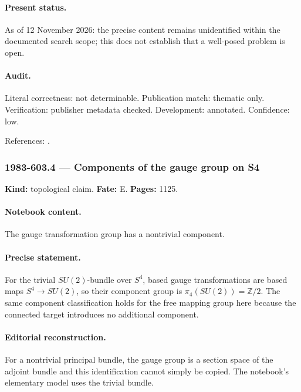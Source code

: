 \paragraph{Present status.} As of 12 November 2026: the precise content remains unidentified within the documented search scope; this does not establish that a well-posed problem is open.

\paragraph{Audit.} Literal correctness: not determinable. Publication match: thematic only. Verification: publisher metadata checked. Development: annotated. Confidence: low.

\noindent References: \citep{polyakovwiegmann1983goldstone}.\par

\subsubsection{1983-603.4 --- Components of the gauge group on S4}

\label{item:1983-603.4}

\noindent\textbf{Kind:} topological claim. \textbf{Fate:} E. \textbf{Pages:} 1125.\par

\paragraph{Notebook content.} The gauge transformation group has a nontrivial component.

\paragraph{Precise statement.} For the trivial \(SU(2)\)-bundle over \(S^4\), based gauge transformations are based maps \(S^4\to SU(2)\), so their component group is \(\pi_4(SU(2))=\mathbb Z/2\). The same component classification holds for the free mapping group here because the connected target introduces no additional component.

\paragraph{Editorial reconstruction.} For a nontrivial principal bundle, the gauge group is a section space of the adjoint bundle and this identification cannot simply be copied. The notebook's elementary model uses the trivial bundle.


